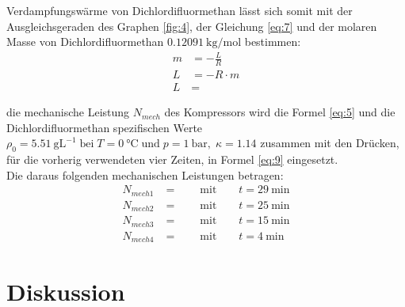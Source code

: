 \justifying Verdampfungswärme von Dichlordifluormethan lässt sich somit mit der Ausgleichsgeraden des Graphen \ref{fig:4}, 
der Gleichung \eqref{eq:7} und der molaren Masse von Dichlordifluormethan $\SI{0.12091}{\kilo\gram\per\mole}$ \cite{Molmasse} bestimmen:
\begin{subequations}
\begin{align}
    m &= -\frac{L}{R} \label{eq:17a} \\
    L &= -R \cdot m \label{eq:17b}\\
    L &= \text{}\label{eq:17c}
\end{align}
\end{subequations}

\justifying die mechanische Leistung $N_{mech}$ des Kompressors wird die Formel \eqref{eq:5} und die Dichlordifluormethan spezifischen Werte 
\cite{V206} $\rho_0 = \SI{5.51}{\gram\liter\tothe{-1}}\; \text{bei}\; T = \SI{0}{\celsius}\; \text{und}\; p = \SI{1}{\bar}, \;\kappa = 1.14$ zusammen mit den
Drücken, für die vorherig verwendeten vier Zeiten, in Formel \eqref{eq:9} eingesetzt. \\
Die daraus folgenden mechanischen Leistungen betragen:
\begin{subequations} \label{eq:18}
\begin{align}
    N_{mech1} &= \text{} \qquad \text{mit} \qquad t = \SI{29}{\minute} \label{eq:18a}\\
    N_{mech2} &= \text{} \qquad \text{mit} \qquad t = \SI{25}{\minute} \label{eq:18b}\\
    N_{mech3} &= \text{} \qquad \text{mit} \qquad t = \SI{15}{\minute} \label{eq:18c}\\
    N_{mech4} &= \text{} \qquad \text{mit} \qquad t = \SI{4}{\minute} \label{eq:18d}
\end{align}
\end{subequations}

\newpage




\section{Diskussion} \label{sec:6}


